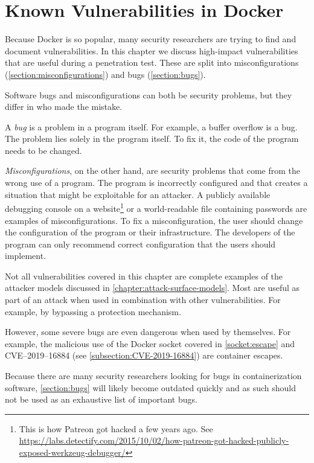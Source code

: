 \chapter{Known Vulnerabilities in Docker}\label{chapter:vulnerabilities}
Because Docker is so popular, many security researchers are trying to find and document vulnerabilities. In this chapter we discuss high-impact vulnerabilities that are useful during a penetration test. These are split into misconfigurations (\autoref{section:misconfigurations}) and bugs (\autoref{section:bugs}).

\medskip

Software bugs and misconfigurations can both be security problems, but they differ in who made the mistake.

A \emph{bug} is a problem in a program itself. For example, a buffer overflow is a bug. The problem lies solely in the program itself. To fix it, the code of the program needs to be changed.

\emph{Misconfigurations}, on the other hand, are security problems that come from the wrong use of a program. The program is incorrectly configured and that creates a situation that might be exploitable for an attacker. A publicly available debugging console on a website\footnote{This is how Patreon got hacked a few years ago. See \url{https://labs.detectify.com/2015/10/02/how-patreon-got-hacked-publicly-exposed-werkzeug-debugger/}} or a world-readable file containing passwords are examples of misconfigurations. To fix a misconfiguration, the user should change the configuration of the program or their infrastructure. The developers of the program can only recommend correct configuration that the users should implement.

\medskip

Not all vulnerabilities covered in this chapter are complete examples of the attacker models discussed in \autoref{chapter:attack-surface-models}. Most are useful as part of an attack when used in combination with other vulnerabilities. For example, by bypassing a protection mechanism.

However, some severe bugs are even dangerous when used by themselves. For example, the malicious use of the Docker socket covered in \autoref{socket:escape} and CVE--2019--16884 (see \autoref{subsection:CVE-2019-16884}) are container escapes.

\medskip

Because there are many security researchers looking for bugs in containerization software, \autoref{section:bugs} will likely become outdated quickly and as such should not be used as an exhaustive list of important bugs.

